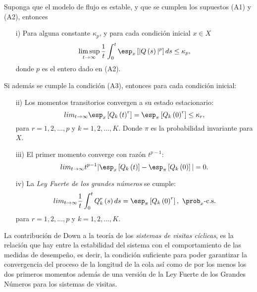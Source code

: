 \begin{Teo}\label{Tma2.1.Down}
Suponga que el modelo de flujo es estable, y que se cumplen los supuestos (A1) y (A2), entonces
\begin{itemize}
\item[i)] Para alguna constante $\kappa_{p}$, y para cada
condici\'on inicial $x\in X$
\begin{equation}\label{Estability.Eq1}
\limsup_{t\rightarrow\infty}\frac{1}{t}\int_{0}^{t}\esp_{x}\left[|Q\left(s\right)|^{p}\right]ds\leq\kappa_{p},
\end{equation}
donde $p$ es el entero dado en (A2).
\end{itemize}
Si adem\'as se cumple la condici\'on (A3), entonces para cada
condici\'on inicial:
\begin{itemize}
\item[ii)] Los momentos transitorios convergen a su estado
estacionario:
 \begin{equation}\label{Estability.Eq2}
lim_{t\rightarrow\infty}\esp_{x}\left[Q_{k}\left(t\right)^{r}\right]=\esp_{\pi}\left[Q_{k}\left(0\right)^{r}\right]\leq\kappa_{r},
\end{equation}
para $r=1,2,\ldots,p$ y $k=1,2,\ldots,K$. Donde $\pi$ es la
probabilidad invariante para $X$.

\item[iii)]  El primer momento converge con raz\'on $t^{p-1}$:
\begin{equation}\label{Estability.Eq3}
lim_{t\rightarrow\infty}t^{p-1}|\esp_{x}\left[Q_{k}\left(t\right)\right]-\esp_{\pi}\left[Q_{k}\left(0\right)\right]|=0.
\end{equation}

\item[iv)] La {\em Ley Fuerte de los grandes n\'umeros} se cumple:
\begin{equation}\label{Estability.Eq4}
lim_{t\rightarrow\infty}\frac{1}{t}\int_{0}^{t}Q_{k}^{r}\left(s\right)ds=\esp_{\pi}\left[Q_{k}\left(0\right)^{r}\right],\textrm{
}\prob_{x}\textrm{-c.s.}
\end{equation}
para $r=1,2,\ldots,p$ y $k=1,2,\ldots,K$.
\end{itemize}
\end{Teo}

La contribuci\'on de Down a la teor\'ia de los {\emph {sistemas de
visitas c\'iclicas}}, es la relaci\'on que hay entre la
estabilidad del sistema con el comportamiento de las medidas de
desempe\~no, es decir, la condici\'on suficiente para poder
garantizar la convergencia del proceso de la longitud de la cola
as\'i como de por los menos los dos primeros momentos adem\'as de
una versi\'on de la Ley Fuerte de los Grandes N\'umeros para los
sistemas de visitas.


